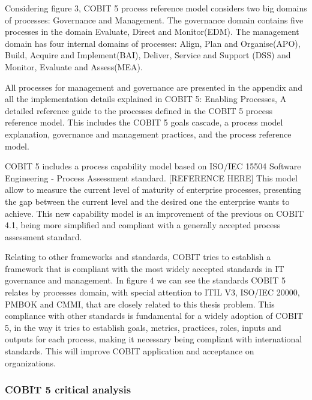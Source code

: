 Considering figure 3, COBIT 5 process reference model considers two big domains of processes: Governance and Management. The governance domain contains five processes in the domain Evaluate, Direct and Monitor(EDM). The management domain has four internal domains of processes: Align, Plan and Organise(APO), Build, Acquire and Implement(BAI), Deliver, Service and Support (DSS) and Monitor, Evaluate and Assess(MEA).\par
All processes for management and governance are presented in the appendix and all the implementation details explained in COBIT 5: Enabling Processes, A detailed reference guide to the processes defined in the COBIT 5 process reference model. This includes the COBIT 5 goals cascade, a process model explanation, governance and management practices, and the process reference model\cite{2012cobitEP}.\par
COBIT 5 includes a process capability model based on ISO/IEC 15504 Software Engineering - Process Assessment standard. [REFERENCE HERE] This model allow to measure the current level of maturity of enterprise processes, presenting the gap between the current level and the desired one the enterprise wants to achieve. This new capability model is an improvement of the previous on COBIT 4.1, being more simplified and compliant with a generally accepted process assessment standard.\par
Relating to other frameworks and standards, COBIT tries to establish a framework that is compliant with the most widely accepted standards in IT governance and management. In figure 4 we can see the standards COBIT 5 relates by processes domain, with special attention to ITIL V3, ISO/IEC 20000, PMBOK and CMMI, that are closely related to this thesis problem. This compliance with other standards is fundamental for a widely adoption of COBIT 5, in the way it tries to establish goals, metrics, practices, roles, inputs and outputs for each process, making it necessary being compliant with international standards. This will improve COBIT application and acceptance on organizations.\par

\subsubsection{COBIT 5 critical analysis}

